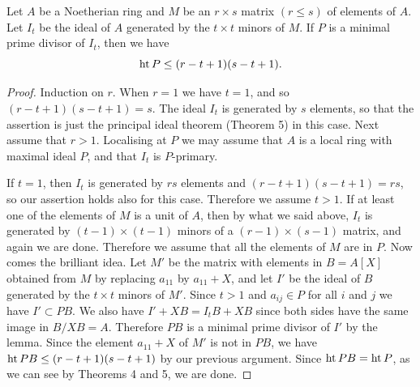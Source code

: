 \begin{theorem}[Eagon]\label{thm:13.10}
Let $A$ be a Noetherian ring and $M$ be an $r \times s$
matrix $(r \le s)$ of elements of $A$. Let $I_t$ be the ideal of $A$ generated by the $t \times t$
minors of $M$. If $P$ is a minimal prime divisor of $I_t$, then we have
\[
  \operatorname{ht} P \le (r - t + 1)(s - t + 1).
\]
\end{theorem}

\begin{proof}
Induction on $r$. When $r = 1$ we have $t = 1$, and so $(r - t + 1)(s - t +
1) = s$. The ideal $I_t$ is generated by $s$ elements, so that the assertion is just
the principal ideal theorem (Theorem 5) in this case. Next assume that $r > 1$.
Localising at $P$ we may assume that $A$ is a local ring with maximal ideal $P$,
and that $I_t$ is $P$-primary.

If $t = 1$, then $I_t$ is generated by $rs$ elements and $(r - t + 1)(s - t + 1) = rs$,
so our assertion holds also for this case. Therefore we assume $t > 1$. If at
least one of the elements of $M$ is a unit of $A$, then by what we said above, $I_t$ is
generated by $(t - 1) \times (t - 1)$ minors of a $(r - 1) \times (s - 1)$ matrix, and again
we are done. Therefore we assume that all the elements of $M$ are in $P$. Now
comes the brilliant idea. Let $M'$ be the matrix with elements in $B = A[X]$
obtained from $M$ by replacing $a_{11}$ by $a_{11} + X$, and let $I'$ be the ideal of $B$
generated by the $t \times t$ minors of $M'$. Since $t > 1$ and $a_{ij} \in P$ for all $i$ and $j$ we
have $I' \subset PB$. We also have $I' + XB = I_tB + XB$ since both sides have the
same image in $B/XB = A$. Therefore $PB$ is a minimal prime divisor of $I'$ by
the lemma. Since the element $a_{11} + X$ of $M'$ is not in $PB$, we have
$\operatorname{ht} PB \le (r - t + 1)(s - t + 1)$ by our previous argument. Since $\operatorname{ht} PB = \operatorname{ht} P$,
as we can see by Theorems 4 and 5, we are done.
\end{proof}
